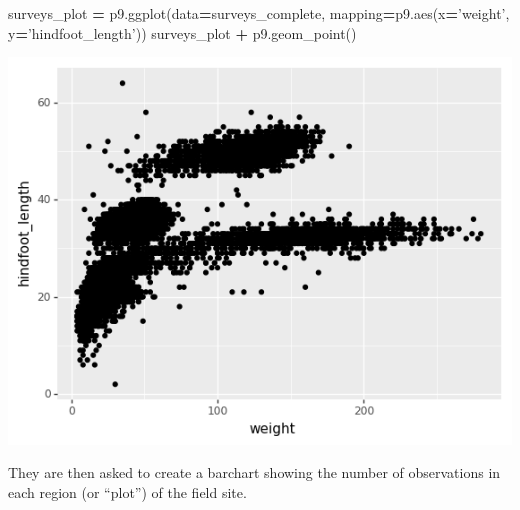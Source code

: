\documentclass[]{book}
\newenvironment{Shaded}{\begin{snugshade}}{\end{snugshade}}
\newcommand{\NormalTok}[1]{#1}
\newcommand{\OperatorTok}[1]{\textcolor[rgb]{0.81,0.36,0.00}{\textbf{#1}}}
\newcommand{\StringTok}[1]{\textcolor[rgb]{0.31,0.60,0.02}{#1}}
\begin{document}
\begin{Shaded}
\begin{Highlighting}[]
\NormalTok{surveys_plot }\OperatorTok{=}\NormalTok{ p9.ggplot(data}\OperatorTok{=}\NormalTok{surveys_complete,}
\NormalTok{                         mapping}\OperatorTok{=}\NormalTok{p9.aes(x}\OperatorTok{=}\StringTok{'weight'}\NormalTok{, y}\OperatorTok{=}\StringTok{'hindfoot_length'}\NormalTok{))}
\NormalTok{surveys_plot }\OperatorTok{+}\NormalTok{ p9.geom_point()}
\end{Highlighting}
\end{Shaded}

\includegraphics{./figures/python_scatterplot_example.png}

They are then asked to create a barchart showing the number of observations in each region
(or ``plot'') of the field site.
\end{document}
